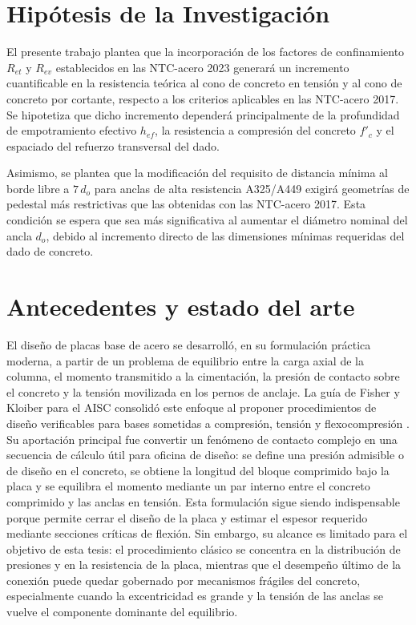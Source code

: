 \section{Hipótesis de la Investigación}

El presente trabajo plantea que la incorporación de los factores de confinamiento $R_{et}$ y
$R_{ev}$ establecidos en las NTC-acero 2023 generará un incremento cuantificable en la resistencia
teórica al cono de concreto en tensión y al cono de concreto por cortante, respecto a los criterios
aplicables en las NTC-acero 2017. Se hipotetiza que dicho incremento dependerá principalmente de la
profundidad de empotramiento efectivo $h_{ef}$, la resistencia a compresión del concreto $f'_c$ y
el espaciado del refuerzo transversal del dado.

Asimismo, se plantea que la modificación del requisito de distancia mínima al borde libre a
$7\,d_o$ para anclas de alta resistencia A325/A449 exigirá geometrías de pedestal más restrictivas
que las obtenidas con las NTC-acero 2017. Esta condición se espera que sea más significativa al
aumentar el diámetro nominal del ancla $d_o$, debido al incremento directo de las dimensiones
mínimas requeridas del dado de concreto.

\section{Antecedentes y estado del arte}

El diseño de placas base de acero se desarrolló, en su formulación práctica moderna, a partir de
un problema de equilibrio entre la carga axial de la columna, el momento transmitido a la
cimentación, la presión de contacto sobre el concreto y la tensión movilizada en los pernos de
anclaje. La guía de Fisher y Kloiber para el AISC consolidó este enfoque al proponer procedimientos
de diseño verificables para bases sometidas a compresión, tensión y flexocompresión
\cite{FisherKloiber_2006}. Su aportación principal fue convertir un fenómeno de contacto complejo
en una secuencia de cálculo útil para oficina de diseño: se define una presión admisible o de
diseño en el concreto, se obtiene la longitud del bloque comprimido bajo la placa y se equilibra el
momento mediante un par interno entre el concreto comprimido y las anclas en tensión. Esta
formulación sigue siendo indispensable porque permite cerrar el diseño de la placa y estimar el
espesor requerido mediante secciones críticas de flexión. Sin embargo, su alcance es limitado para
el objetivo de esta tesis: el procedimiento clásico se concentra en la distribución de presiones y
en la resistencia de la placa, mientras que el desempeño último de la conexión puede quedar
gobernado por mecanismos frágiles del concreto, especialmente cuando la excentricidad es grande y
la tensión de las anclas se vuelve el componente dominante del equilibrio.

